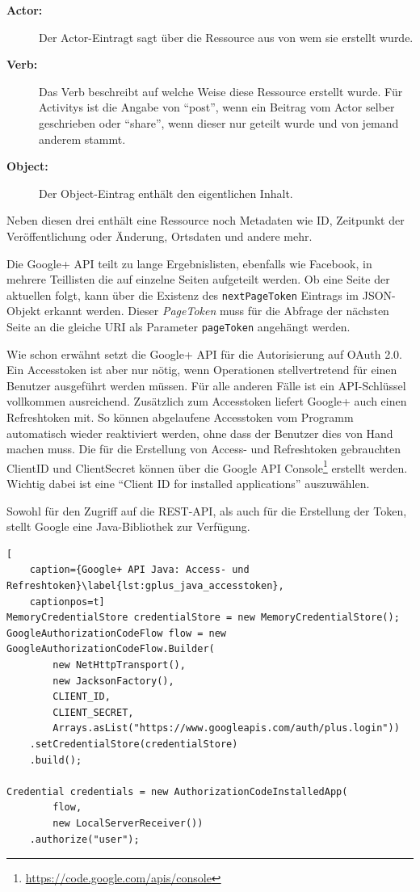 \begin{description}
    \item[\textbf{Actor:}] Der Actor-Eintragt sagt über die Ressource aus von wem sie erstellt wurde. 
    \item[\textbf{Verb:}] Das Verb beschreibt auf welche Weise diese Ressource erstellt wurde. Für Activitys ist die Angabe von \enquote{post}, wenn ein Beitrag vom Actor selber geschrieben oder \enquote{share}, wenn dieser nur geteilt wurde und von jemand anderem stammt. 
    \item[\textbf{Object:}] Der Object-Eintrag enthält den eigentlichen Inhalt.
\end{description}

Neben diesen drei enthält eine Ressource noch Metadaten wie ID, Zeitpunkt der Veröffentlichung oder Änderung, Ortsdaten und andere mehr.

Die Google+ API teilt zu lange Ergebnislisten, ebenfalls wie Facebook, in mehrere Teillisten die auf einzelne Seiten aufgeteilt werden. Ob eine Seite der aktuellen folgt, kann über die Existenz des \texttt{nextPageToken} Eintrags im JSON-Objekt erkannt werden. Dieser \emph{PageToken} muss für die Abfrage der nächsten Seite an die gleiche URI als Parameter \texttt{pageToken} angehängt werden. 

Wie schon erwähnt setzt die Google+ API für die Autorisierung auf OAuth 2.0. Ein Accesstoken ist aber nur nötig, wenn Operationen stellvertretend für einen Benutzer ausgeführt werden müssen. Für alle anderen Fälle ist ein API-Schlüssel vollkommen ausreichend. Zusätzlich zum Accesstoken liefert Google+ auch einen Refreshtoken mit. So können abgelaufene Accesstoken vom Programm automatisch wieder reaktiviert werden, ohne dass der Benutzer dies von Hand machen muss. Die für die Erstellung von Access- und Refreshtoken gebrauchten ClientID und ClientSecret können über die Google API Console\footnote{\url{https://code.google.com/apis/console}} erstellt werden. Wichtig dabei ist eine \enquote{Client ID for installed applications} auszuwählen. 

Sowohl für den Zugriff auf die REST-API, als auch für die Erstellung der Token, stellt Google eine Java-Bibliothek zur Verfügung. 

\begin{lstlisting}[
    caption={Google+ API Java: Access- und Refreshtoken}\label{lst:gplus_java_accesstoken},
    captionpos=t]
MemoryCredentialStore credentialStore = new MemoryCredentialStore();
GoogleAuthorizationCodeFlow flow = new GoogleAuthorizationCodeFlow.Builder(
        new NetHttpTransport(),
        new JacksonFactory(),
        CLIENT_ID,
        CLIENT_SECRET,
        Arrays.asList("https://www.googleapis.com/auth/plus.login"))
    .setCredentialStore(credentialStore)
    .build();

Credential credentials = new AuthorizationCodeInstalledApp(
        flow,
        new LocalServerReceiver())
    .authorize("user");
\end{lstlisting}

